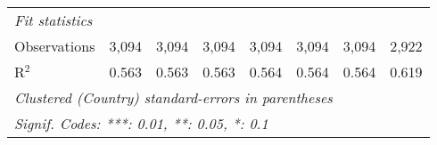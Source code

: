 \begin{tabular}{lccccccc}
   \midrule \emph{Fit statistics}\\
   Observations                                                             & 3,094         & 3,094         & 3,094         & 3,094         & 3,094         & 3,094         & 2,922\\  
   R$^2$                                                                    & 0.563         & 0.563         & 0.563         & 0.564         & 0.564         & 0.564         & 0.619\\  
   \midrule
   \multicolumn{8}{l}{\emph{Clustered (Country) standard-errors in parentheses}}\\
   \multicolumn{8}{l}{\emph{Signif. Codes: ***: 0.01, **: 0.05, *: 0.1}}\\
\end{tabular}
\par\endgroup


